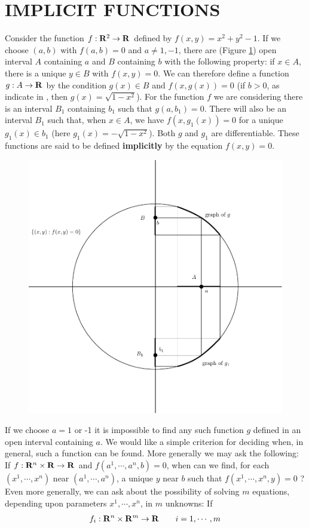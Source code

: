 \section{IMPLICIT FUNCTIONS}
Consider the function $f:\mathbf{R}^2\to \mathbf{R}$ defined by $f(x, y) = x^2 + y^2 -1$. If 
we choose $(a, b)$ with $f(a, b) = 0$ and $a\neq 1, -1$, there are  (Figure \ref{Fig 2-4}) open 
interval $A$ containing $a$ and $B$ containing $b$ with the following property:
if $x\in A$, there is a unique $y\in B$ with $f(x, y) = 0$. We can therefore define 
a function $g:A\to \mathbf{R}$ by the condition $g(x)\in B$ and $f(x, g(x)) = 0$ (if $b>0$,
as indicate in , then $g(x) = \sqrt{1-x^2}$). For the function $f$ we are considering
there is an interval $B_1$ containing $b_1$ such that $g(a, b_1)=0$. There will also be 
an interval $B_1$ such that, when $x\in A$, we have $f(x, g_1(x)) = 0$ for a unique $g_1(x)\in b_1$ 
(here $g_1(x) = -\sqrt{1-x^2}$). Both $g$ and $g_1$ are differentiable. These functions are 
said to be defined \textbf{implicitly} by the equation $f(x, y) = 0$.

\begin{figure}[!htb]
    \centering
    \includegraphics[width=.75\linewidth]{./pics/Fig2-4.pdf}
    \caption{}
    \label{Fig 2-4}
\end{figure}

If we choose $a = 1$ or -1 it is impossible to find any such
function $g$ defined in an open interval containing $a$.
We would like a simple criterion for deciding when, in general,
such a function can be found. More generally we may ask
the following: If $f:\mathbf{R}^n \times \mathbf{R}\to \mathbf{R}$ and 
$f(a^1,\cdots,a^n, b) = 0$, when can we find, for each 
$(x^1,\cdots ,x^n)$ near $(a^1,\cdots,a^n)$,
a unique $y$ near $b$ such that $f(x^1,\cdots,x^n,y) = 0$ ? Even
more generally, we can ask about the possibility of solving
$m$ equations, depending upon parameters $x^1,\cdots,x^n$, in $m$
unknowns: If
\begin{align*}
    f_i:\mathbf{R}^n\times \mathbf{R}^m \to \mathbf{R}\qquad i=1, \cdots, m
\end{align*}

